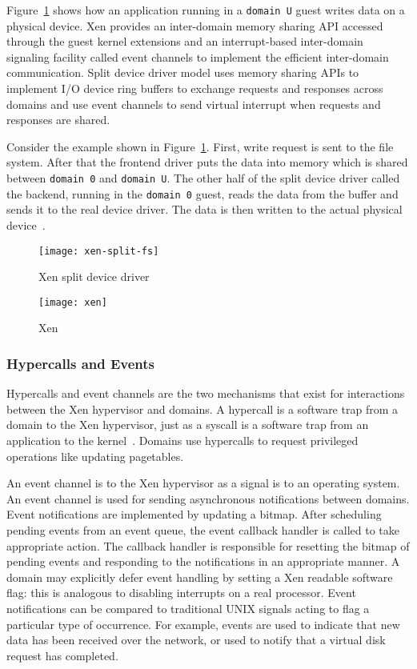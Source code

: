 Figure~\ref{xen-split2} shows how an application running in a \texttt{domain U} guest writes data on a physical device. Xen provides an inter-domain memory sharing API accessed through the guest kernel extensions and an interrupt-based inter-domain signaling facility called event channels to implement the efficient inter-domain communication. Split device driver model uses memory sharing APIs to implement I/O device ring buffers to exchange requests and responses across domains and use event channels to send virtual interrupt when requests and responses are shared. 

Consider the example shown in Figure~\ref{xen-split2}. First, write request is sent to the file system. After that the frontend driver puts the data into memory which is shared between \texttt{domain 0} and \texttt{domain U}. The other half of the split device driver called the backend, running in the \texttt{domain 0} guest, reads the data from the buffer and sends it to the real device driver. The data is then written to the actual physical device~\cite{Chisnall:2007:DGX:1407351}.

\begin{figure}[!h]
\centering
\texttt{[image: xen-split-fs]}
\caption{Xen split device driver}
\label{xen-split2}
\end{figure}
\begin{figure}[!h]
\centering
\texttt{[image: xen]}
\caption{Xen}
\label{xen}
\end{figure}

\subsubsection*{Hypercalls and Events}
Hypercalls and event channels are the two mechanisms that exist for interactions between the Xen hypervisor and domains. A hypercall is a software trap from a domain to the Xen hypervisor, just as a syscall is a software trap from an application to the kernel~\cite{hypercall}. Domains use hypercalls to request privileged operations like updating pagetables. 

An event channel is to the Xen hypervisor as a signal is to an operating system. An event channel is used for sending asynchronous notifications between domains. Event notifications are implemented by updating a bitmap. After scheduling pending events from an event queue, the event callback handler is called to take appropriate action. The callback handler is responsible for resetting the bitmap of pending events and responding to the notifications in an appropriate manner. A domain may explicitly defer event handling by setting a Xen readable software flag: this is analogous to disabling interrupts on a real processor. Event notifications can be compared to traditional UNIX signals acting to flag a particular type of occurrence. For example, events are used to indicate that new data has been received over the network, or used to notify that a virtual disk request has completed. 

